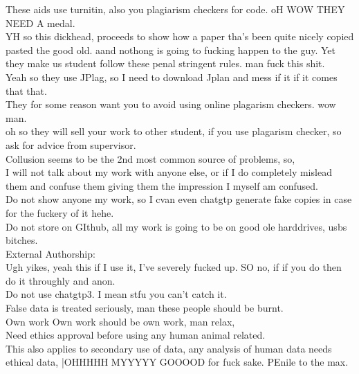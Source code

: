 \documentclass [12pt]{article}
\begin{document}
 These aids use turnitin, also you plagiarism checkers for code. oH WOW THEY NEED A   medal.\\ 


 YH so this dickhead, proceeds to show how a paper tha's been quite nicely copied pasted the good old. aand nothong is going to fucking happen to the guy. Yet they make us student follow these penal stringent rules. man fuck this shit.\\ 


Yeah so they use JPlag, so I need to download Jplan and mess if it if it comes that that.\\ 

They for some reason want you to avoid using online plagarism checkers. wow man.\\ 

oh so they will sell your work to other student, if you use plagarism checker, so ask for advice from supervisor.\\ 


Collusion seems to be the 2nd most common source of problems, so,\\ 
I will not talk about my work with anyone else, or if I do completely mislead them and confuse them giving them the impression I myself am confused.\\ 

Do not show anyone my work, so I cvan even chatgtp generate fake copies in case for the fuckery of it hehe.\\ 

Do not store on GIthub, all my work is going to be on good ole harddrives, usbs bitches.\\ 

External Authorship:\\ 
Ugh yikes, yeah this if I use it, I've severely fucked up. SO no, if if you do then do it throughly and anon.\\

Do not use chatgtp3. I mean stfu you can't catch it.\\ 

False data is treated seriously, man these people should be burnt.\\ 

Own work Own work should be own work, man relax,\\ 

Need ethics approval before using any human animal related.\\ 
This also applies to secondary use of data, any analysis of human data needs ethical data, |OHHHHH MYYYYY GOOOOD for fuck sake. PEnile to the max.\\ 
\end{document}
